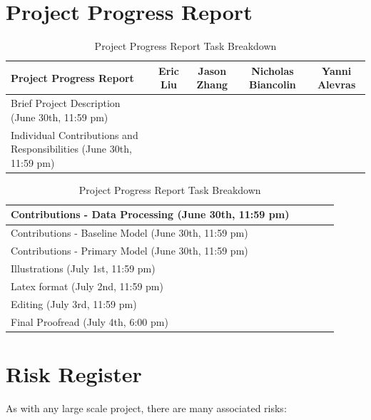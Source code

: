 \documentclass{article} %
\begin{document}
\section*{Project Progress Report}

\begin{table}[ht]
    \centering
    \begin{tabular}{|l|c|c|c|c|}
        \hline
        \rowcolor{gray!50}
        \textbf{Project Progress Report} & \textbf{Eric Liu} & \textbf{Jason Zhang} & \textbf{Nicholas Biancolin} & \textbf{Yanni Alevras} \\
        \hline
        \rowcolor{red!50}
        Brief Project Description (June 30th, 11:59 pm) & & & & \\
        \hline
        \rowcolor{red!50}
        Individual Contributions and Responsibilities (June 30th, 11:59 pm) & & & & \\
        \hline
    \end{tabular}
    \caption{Project Progress Report Task Breakdown}
\end{table}

\begin{table}[ht]
    \centering
    \begin{tabular}{|l|c|c|c|c|}
        \hline
        \rowcolor{red!50}
        Contributions - Data Processing (June 30th, 11:59 pm) & & & & \\
        \hline
        \rowcolor{red!50}
        Contributions - Baseline Model (June 30th, 11:59 pm) & & & & \\
        \hline
        \rowcolor{red!50}
        Contributions - Primary Model (June 30th, 11:59 pm) & & & & \\
        \hline
        \rowcolor{red!50}
        Illustrations (July 1st, 11:59 pm) & & & & \\
        \hline
        \rowcolor{red!50}
        Latex format (July 2nd, 11:59 pm) & & & & \\
        \hline
        \rowcolor{red!50}
        Editing (July 3rd, 11:59 pm) & & & & \\
        \hline
        \rowcolor{red!50}
        Final Proofread (July 4th, 6:00 pm) & & & & \\
        \hline
    \end{tabular}
    \caption{Project Progress Report Task Breakdown}
\end{table}

\section{Risk Register}
As with any large scale project, there are many associated risks:
\end{document}
